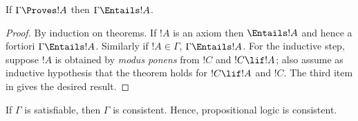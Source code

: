 \documentclass[../../../include/open-logic-section]{subfiles}
\begin{document}

\begin{thm}[Soundness] 
If $\Gamma\Proves!A$ then
$\Gamma \Entails !A$. 
\end{thm}

\begin{proof} 
By induction on theorems. If $!A$ is an axiom then $\Entails
!A$ and hence a fortiori $\Gamma \Entails!A$. Similarly if $!A \in \Gamma$,
$\Gamma \Entails!A$. For the inductive step, suppose $!A$ is obtained by
\emph{modus ponens} from $!C$ and $!C\lif!A$; also assume as inductive
hypothesis that the theorem holds for $!C\lif !A$ and $!C$. The third item
in  gives the desired result. 
\end{proof}

\begin{cor} 
If $\Gamma$ is satisfiable, then $\Gamma$ is consistent. Hence,
propositional logic is consistent. 
\end{cor}
\end{document}
